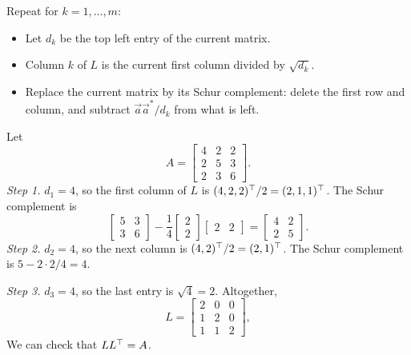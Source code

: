 \begin{strategy}
  Repeat for $k = 1, \dots, m$:
  \begin{itemize}
    \item Let $d_k$ be the top left entry of the current matrix.
    \item Column $k$ of $L$ is the current first column divided by $\sqrt{d_k}$.
    \item Replace the current matrix by its Schur complement: delete the first row and column, and subtract $\vec{a}\vec{a}^\ast/d_k$ from what is left.
  \end{itemize}
\end{strategy}

\begin{example}
  \label{ex:chol-3x3}
  Let
  \begin{equation}
    A = \begin{bmatrix} 4 & 2 & 2 \\ 2 & 5 & 3 \\ 2 & 3 & 6 \end{bmatrix}.
  \end{equation}
  \emph{Step 1.} $d_1 = 4$, so the first column of $L$ is $(4, 2, 2)^\top/2 = (2, 1, 1)^\top$. The Schur complement is
  \begin{equation}
    \begin{bmatrix} 5 & 3 \\ 3 & 6 \end{bmatrix} - \frac{1}{4}\begin{bmatrix} 2 \\ 2 \end{bmatrix}\begin{bmatrix} 2 & 2 \end{bmatrix} = \begin{bmatrix} 4 & 2 \\ 2 & 5 \end{bmatrix}.
  \end{equation}
  \emph{Step 2.} $d_2 = 4$, so the next column is $(4, 2)^\top/2 = (2, 1)^\top$. The Schur complement is $5 - 2 \cdot 2/4 = 4$.

  \emph{Step 3.} $d_3 = 4$, so the last entry is $\sqrt{4} = 2$. Altogether,
  \begin{equation}
    L = \begin{bmatrix} 2 & 0 & 0 \\ 1 & 2 & 0 \\ 1 & 1 & 2 \end{bmatrix},
  \end{equation}
  We can check that $LL^\top = A$.
\end{example}

